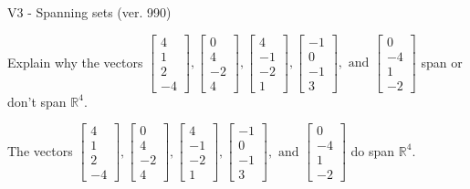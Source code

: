 \begin{exercise}
  \begin{exerciseTitle}V3 - Spanning sets (ver. 990)\end{exerciseTitle}
  \begin{exerciseStatement}
    Explain why the vectors \(\left[\begin{array}{r}
4 \\
1 \\
2 \\
-4
\end{array}\right] , \left[\begin{array}{r}
0 \\
4 \\
-2 \\
4
\end{array}\right] , \left[\begin{array}{r}
4 \\
-1 \\
-2 \\
1
\end{array}\right] , \left[\begin{array}{r}
-1 \\
0 \\
-1 \\
3
\end{array}\right] , \text{ and } \left[\begin{array}{r}
0 \\
-4 \\
1 \\
-2
\end{array}\right]\) span or don't span \(\mathbb{R}^4\). 
	


  \end{exerciseStatement}
  \begin{exerciseAnswer}
   The vectors \(\left[\begin{array}{r}
4 \\
1 \\
2 \\
-4
\end{array}\right] , \left[\begin{array}{r}
0 \\
4 \\
-2 \\
4
\end{array}\right] , \left[\begin{array}{r}
4 \\
-1 \\
-2 \\
1
\end{array}\right] , \left[\begin{array}{r}
-1 \\
0 \\
-1 \\
3
\end{array}\right] , \text{ and } \left[\begin{array}{r}
0 \\
-4 \\
1 \\
-2
\end{array}\right]\) 
  	 do  
	span \(\mathbb{R}^4\).
  



\end{exerciseAnswer}
\end{exercise}
